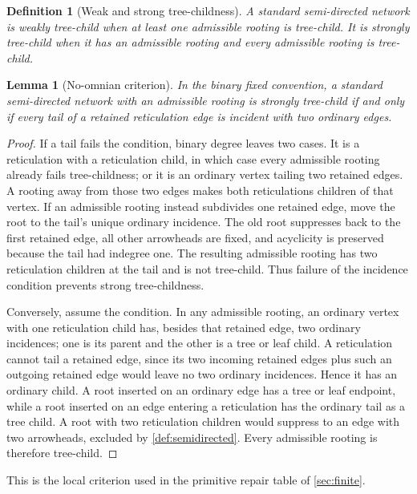 \documentclass[11pt]{article}
\newtheorem{lemma}[theorem]{Lemma}
\newtheorem{definition}[theorem]{Definition}
\theoremstyle{remark}
\newcommand{\1}{\mathbf 1}
\begin{document}
\begin{definition}[Weak and strong tree-childness]\label{def:strong}
A standard semi-directed network is \emph{weakly tree-child} when at least one
admissible rooting is tree-child.  It is \emph{strongly tree-child} when it has
an admissible rooting and every admissible rooting is tree-child.
\end{definition}

\begin{lemma}[No-omnian criterion]\label{lem:no-omnian}
In the binary fixed convention, a standard semi-directed network with an
admissible rooting is strongly tree-child if and only if every tail of a
retained reticulation edge is incident with two ordinary edges.
\end{lemma}

\begin{proof}
If a tail fails the condition, binary degree leaves two cases.  It is a
reticulation with a reticulation child, in which case every admissible rooting
already fails tree-childness; or it is an ordinary vertex tailing two retained
edges.  A rooting away from those two edges makes both reticulations children
of that vertex.  If an admissible rooting instead subdivides one retained
edge, move the root to the tail's unique ordinary incidence.  The old root
suppresses back to the first retained edge, all other arrowheads are fixed,
and acyclicity is preserved because the tail had indegree one.  The resulting
admissible rooting has two reticulation children at the tail and is not
tree-child.  Thus failure of the incidence condition prevents strong
tree-childness.

Conversely, assume the condition.  In any admissible rooting, an ordinary
vertex with one reticulation child has, besides that retained edge, two
ordinary incidences; one is its parent and the other is a tree or leaf child.
A reticulation cannot tail a retained edge, since its two incoming retained
edges plus such an outgoing retained edge would leave no two ordinary
incidences.  Hence it has an ordinary child.  A root inserted on an ordinary
edge has a tree or leaf endpoint, while a root inserted on an edge entering a
reticulation has the ordinary tail as a tree child.  A root with two
reticulation children would suppress to an edge with two arrowheads, excluded
by \cref{def:semidirected}.  Every admissible rooting is therefore tree-child.
\end{proof}

This is the local criterion used in the primitive repair table of
\cref{sec:finite}.
\end{document}
